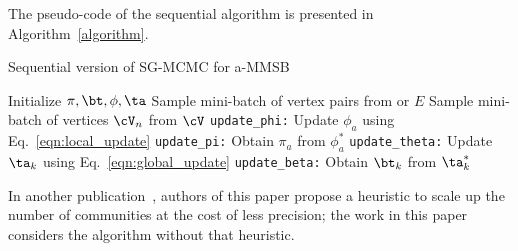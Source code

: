 The pseudo-code of the sequential algorithm is presented in Algorithm~\ref{algorithm}. 

\begin{algorithm}[t]
\caption{Sequential version of SG-MCMC for a-MMSB}\label{alg}
\begin{algorithmic}[1]
\STATE Initialize $\pi , \bt, \phi, \ta$
\STATE Sample mini-batch of vertex pairs \Minibatch from \Edges or $E$
    \STATE Sample mini-batch of vertices $\Neighbors$ from $\Vertices$
    \STATE \texttt{update\_phi:} Update $\phi_{a}$ using Eq.~\ref{eqn:local_update} \ENDFOR
    \STATE \texttt{update\_pi:} Obtain $\pi_a$ from $\phi_a^*$ \ENDFOR
{}
    \STATE \texttt{update\_theta:} Update $\ta_{k}$ using Eq.~\ref{eqn:global_update} \ENDFOR
{}
    \STATE \texttt{update\_beta:} Obtain $\bt_k$ from $\ta_k^*$ \ENDFOR
\ENDWHILE
\end{algorithmic}
\label{algorithm}
\end{algorithm}

In another publication~\cite{LiAW15},
authors of this paper
propose a heuristic to scale up the number of
communities at the cost of less precision; the work in this paper considers the
algorithm without that heuristic.

